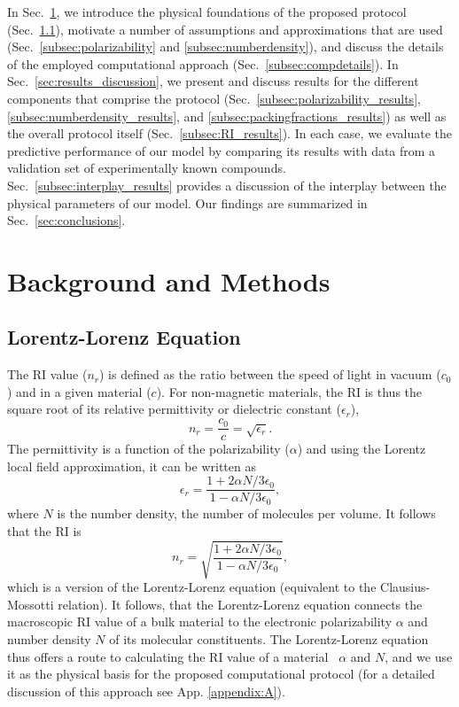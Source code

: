In Sec.\ \ref{sec:methods}, we introduce the physical foundations of the proposed protocol (Sec.\ \ref{subsec:lorentzlorenz}), 
motivate a number of assumptions and approximations that are used (Sec.\ \ref{subsec:polarizability} and \ref{subsec:numberdensity}), and discuss the details of the employed computational approach (Sec.\ \ref{subsec:compdetails}). In Sec.\ \ref{sec:results_discussion}, we present and discuss results for the different components that comprise the protocol (Sec.\ \ref{subsec:polarizability_results}, \ref{subsec:numberdensity_results}, and \ref{subsec:packingfractions_results}) as well as the overall protocol itself (Sec.\ \ref{subsec:RI_results}). In each case, we evaluate the predictive performance of our model by comparing its results with data from a validation set of experimentally known compounds. Sec.\ \ref{subsec:interplay_results} provides a discussion of the interplay between the physical parameters of our model. Our findings are summarized in Sec.\ \ref{sec:conclusions}.



\section{Background and Methods}
\label{sec:methods}
\subsection{Lorentz-Lorenz Equation}
\label{subsec:lorentzlorenz}
The RI value ($n_r$) is defined as the ratio between the speed of light in vacuum ($c_0$) and in a given material ($c$). For non-magnetic materials, the RI is thus the square root of its relative permittivity 
or dielectric constant 
($\epsilon_r$), \ie 
$$n_r=\dfrac{c_0}{c} = \sqrt{\epsilon_r}.$$
The permittivity is a function of the polarizability ($\alpha$) and using the Lorentz local field approximation, it can be written as
$${\epsilon{}}_r=\frac{1+2\alpha{}N/{3\epsilon{}}_0}{1-\alpha{}N/{3\epsilon{}}_0},$$
where $N$ is the number density, \ie   the number of molecules per volume. It follows that the RI is
$$n_r=\sqrt{\frac{1+2\alpha{}N/{3\epsilon{}}_0}{1-\alpha{}N/{3\epsilon{}}_0}},$$
which is a version of the Lorentz-Lorenz equation (equivalent to the Clausius-Mossotti relation). It follows, that the Lorentz-Lorenz equation connects the macroscopic RI value of a bulk material to the electronic polarizability $\alpha$ and number density $N$ of its molecular constituents.
The Lorentz-Lorenz equation thus offers a route to calculating the RI value of a material \via\ $\alpha$ and $N$, and we use it as the physical basis for the proposed computational protocol (for a detailed discussion of this approach see App.
\ref{appendix:A}).  


